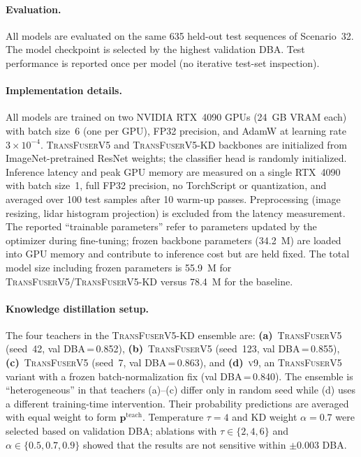 \documentclass[journal,10pt,twoside]{IEEEtran}
\newcommand{\ours}{\textsc{TransFuserV5}}
\newcommand{\distill}{\textsc{TransFuserV5-KD}}
\begin{document}
\paragraph{Evaluation.}
All models are evaluated on the same 635 held-out test sequences of Scenario~32.
The model checkpoint is selected by the highest validation DBA.
Test performance is reported once per model (no iterative test-set inspection).

\paragraph{Implementation details.}
All models are trained on two NVIDIA RTX~4090 GPUs (24~GB VRAM each) with
batch size~6 (one per GPU), FP32 precision, and AdamW at learning rate
$3 \times 10^{-4}$.
\ours{} and \distill{} backbones are initialized from ImageNet-pretrained ResNet
weights; the classifier head is randomly initialized.
Inference latency and peak GPU memory are measured on a single RTX~4090 with
batch size~1, full FP32 precision, no TorchScript or quantization, and
averaged over 100 test samples after 10 warm-up passes. Preprocessing
(image resizing, lidar histogram projection) is excluded from the latency
measurement.
The reported ``trainable parameters'' refer to parameters updated by the optimizer
during fine-tuning; frozen backbone parameters (34.2~M) are loaded into GPU
memory and contribute to inference cost but are held fixed. The total model
size including frozen parameters is 55.9~M for \ours{}/\distill{} versus
78.4~M for the baseline.

\paragraph{Knowledge distillation setup.}
The four teachers in the \distill{} ensemble are:
\textbf{(a)}~\ours{} (seed~42, val DBA\,=\,0.852),
\textbf{(b)}~\ours{} (seed~123, val DBA\,=\,0.855),
\textbf{(c)}~\ours{} (seed~7, val DBA\,=\,0.863), and
\textbf{(d)}~\textsc{v9}, an \ours{} variant with a frozen batch-normalization
fix (val DBA\,=\,0.840).
The ensemble is ``heterogeneous'' in that teachers (a)--(c) differ only in random
seed while (d) uses a different training-time intervention. Their probability
predictions are averaged with equal weight to form $\mathbf{p}^{\text{teach}}$.
Temperature $\tau=4$ and KD weight $\alpha=0.7$ were selected based on
validation DBA; ablations with $\tau \in \{2, 4, 6\}$ and $\alpha \in \{0.5, 0.7, 0.9\}$
showed that the results are not sensitive within $\pm 0.003$ DBA.
\end{document}
